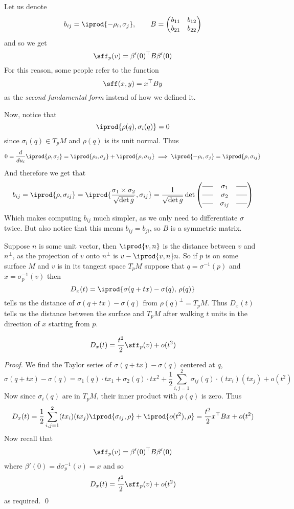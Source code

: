 Let us denote
\[ b_{ij} = \iprod{-\rho_i,\sigma_j},\qquad B = \pmat{b_{11} & b_{12} \\ b_{21} & b_{22}} \]
and so we get
\[ \sff_p(v) = \beta'(0)^\top B\beta'(0) \]
For this reason, some people refer to the function
\[ \sff(x,y) = x^\top By \]
as the \emph{second fundamental form} instead of how we defined it.

Now, notice that
\[ \iprod{\rho(q),\sigma_i(q)} = 0 \]
since $\sigma_i(q)\in T_pM$ and $\rho(q)$ is its unit normal.
Thus
\[ 0 = \frac{d}{du_i}\iprod{\rho,\sigma_j} = \iprod{\rho_i,\sigma_j} + \iprod{\rho,\sigma_{ij}} \implies \iprod{-\rho_i,\sigma_j} = \iprod{\rho,\sigma_{ij}} \]
And therefore we get that
\[ b_{ij} = \iprod{\rho,\sigma_{ij}} = \iprod{\frac{\sigma_1\times\sigma_2}{\sqrt{\det g}},\sigma_{ij}} =
\frac1{\sqrt{\det g}}\det\pmat{\hort & \sigma_1 & \hort \\ \hort & \sigma_2 & \hort \\ \hort & \sigma_{ij} & \hort} \]
Which makes computing $b_{ij}$ much simpler, as we only need to differentiate $\sigma$ twice.
But also notice that this means $b_{ij} = b_{ji}$, so $B$ is a symmetric matrix.

Suppose $n$ is some unit vector, then $\iprod{v,n}$ is the distance between $v$ and $n^\perp$, as the projection of $v$ onto $n^\perp$ is $v-\iprod{v,n}n$.
So if $p$ is on some surface $M$ and $v$ is in its tangent space $T_pM$ suppose that $q=\sigma^{-1}(p)$ and $x=\sigma_p^{-1}(v)$ then
\[ D_x(t) = \iprod{\sigma(q+tx)-\sigma(q),\,\rho(q)} \]
tells us the distance of $\sigma(q+tx)-\sigma(q)$ from $\rho(q)^\perp=T_pM$.
Thus $D_x(t)$ tells us the distance between the surface and $T_pM$ after walking $t$ units in the direction of $x$ starting from $p$.

\begin{prop*}

    \[ D_x(t) = \frac{t^2}2\sff_p(v) + o(t^2) \]

\end{prop*}

\begin{proof}

    We find the Taylor series of $\sigma(q+tx)-\sigma(q)$ centered at $q$,
    \[ \sigma(q+tx) - \sigma(q) = \sigma_1(q)\cdot tx_1 + \sigma_2(q)\cdot tx^2 + \frac12\sum_{i,j=1}^2\sigma_{ij}(q)\cdot(tx_i)(tx_j) + o(t^2) \]
    Now since $\sigma_i(q)$ are in $T_pM$, their inner product with $\rho(q)$ is zero.
    Thus
    \[ D_x(t) = \frac12\sum_{i,j=1}^2 (tx_i)(tx_j)\iprod{\sigma_{ij},\rho} + \iprod{o(t^2),\rho} = \frac{t^2}2 x^\top Bx + o(t^2) \]
    Now recall that
    \[ \sff_p(v) = \beta'(0)^\top B\beta'(0) \]
    where $\beta'(0)=d\sigma_p^{-1}(v)=x$ and so
    \[ D_x(t) = \frac{t^2}2\sff_p(v) + o(t^2) \]
    as required.
    \qed

\end{proof}


